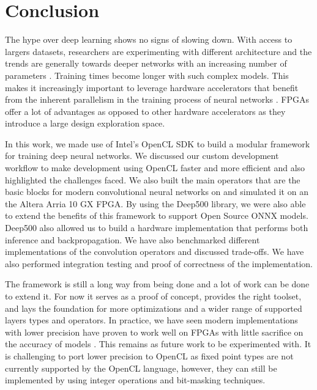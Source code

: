 
\chapter{Conclusion} %

\label{Chapter6} %

The hype over deep learning shows no signs of slowing down. With access to largers datasets, researchers are experimenting with different architecture and the trends are generally towards deeper networks with an increasing number of parameters \citep{ddl}. Training times become longer with such complex models. This makes it increasingly important to leverage hardware accelerators that benefit from the inherent parallelism in the training process of neural networks \cite{ddl}. FPGAs offer a lot of advantages as opposed to other hardware accelerators as they introduce a large design exploration space.

In this work, we made use of Intel's OpenCL SDK \cite{intel2016sdk} to build a modular framework for training deep neural networks. We discussed our custom development workflow to make development using OpenCL faster and more efficient and also highlighted the challenges faced. We also built the main operators that are the basic blocks for modern convolutional neural networks on and simulated it on an the Altera Arria 10 GX FPGA. By using the Deep500 library, we were also able to extend the benefits of this framework to support Open Source ONNX models. Deep500 also allowed us to build a hardware implementation that performs both inference and backpropagation. We have also benchmarked different implementations of the convolution operators and discussed trade-offs. We have also performed integration testing and proof of correctness of the implementation. 

The framework is still a long way from being done and a lot of work can be done to extend it. For now it serves as a proof of concept, provides the right toolset, and lays the foundation for more optimizations and a wider range of supported layers types and operators. In practice, we have seen modern implementations with lower precision have proven to work well on FPGAs with little sacrifice on the accuracy of models \cite{gupta2015deep}. This remains  as future work to be experimented with. It is challenging to port lower precision to OpenCL as fixed point types are not currently supported by the OpenCL language, however, they can still be implemented by using integer operations and bit-masking techniques.


